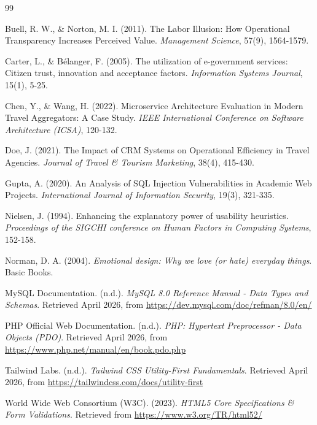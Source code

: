 \documentclass[12pt, a4paper]{article}
\begin{document}
\begin{thebibliography}{99}

Buell, R. W., \& Norton, M. I. (2011). The Labor Illusion: How Operational Transparency Increases Perceived Value. \textit{Management Science}, 57(9), 1564-1579.

Carter, L., \& Bélanger, F. (2005). The utilization of e-government services: Citizen trust, innovation and acceptance factors. \textit{Information Systems Journal}, 15(1), 5-25.

Chen, Y., \& Wang, H. (2022). Microservice Architecture Evaluation in Modern Travel Aggregators: A Case Study. \textit{IEEE International Conference on Software Architecture (ICSA)}, 120-132.

Doe, J. (2021). The Impact of CRM Systems on Operational Efficiency in Travel Agencies. \textit{Journal of Travel \& Tourism Marketing}, 38(4), 415-430.

Gupta, A. (2020). An Analysis of SQL Injection Vulnerabilities in Academic Web Projects. \textit{International Journal of Information Security}, 19(3), 321-335.

Nielsen, J. (1994). Enhancing the explanatory power of usability heuristics. \textit{Proceedings of the SIGCHI conference on Human Factors in Computing Systems}, 152-158.

Norman, D. A. (2004). \textit{Emotional design: Why we love (or hate) everyday things}. Basic Books.

MySQL Documentation. (n.d.). \textit{MySQL 8.0 Reference Manual - Data Types and Schemas}. Retrieved April 2026, from \url{https://dev.mysql.com/doc/refman/8.0/en/}

PHP Official Web Documentation. (n.d.). \textit{PHP: Hypertext Preprocessor - Data Objects (PDO)}. Retrieved April 2026, from \url{https://www.php.net/manual/en/book.pdo.php}

Tailwind Labs. (n.d.). \textit{Tailwind CSS Utility-First Fundamentals}. Retrieved April 2026, from \url{https://tailwindcss.com/docs/utility-first}

World Wide Web Consortium (W3C). (2023). \textit{HTML5 Core Specifications \& Form Validations}. Retrieved from \url{https://www.w3.org/TR/html52/}


\end{thebibliography}
\end{document}
